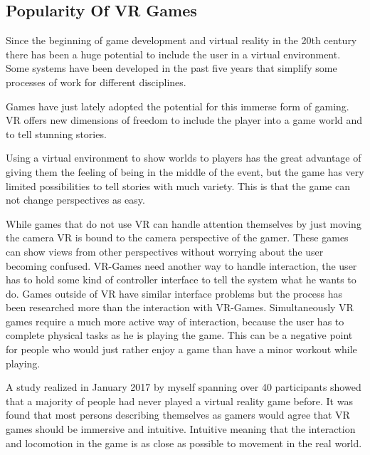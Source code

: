 
\subsection{Popularity Of VR Games}
Since the beginning of game development and virtual reality in the 20th century 
there has been a huge potential to include the user in a virtual environment. 
Some systems have been developed in the past five years that simplify some 
processes of work for different disciplines. 

Games have just lately adopted the potential for this immerse form of gaming. VR offers new dimensions of freedom to include the player into a game world and to tell stunning stories.

Using a virtual environment to show worlds to players has the great advantage of giving them the feeling of being in the middle of the event, but the game has very limited possibilities to tell stories with much variety. This is that the game can not change perspectives as easy. 

While games that do not use VR can handle attention themselves by just moving the camera VR is bound to the camera perspective of the gamer. These games can show views from other perspectives without worrying about the user becoming confused. VR-Games need another way to handle interaction, the user has to hold some kind of controller interface to tell the system what he wants to do. Games outside of VR have similar interface problems but the process has been researched more than the interaction with VR-Games. Simultaneously VR games require a much more active way of interaction, because the user has to complete physical tasks as he is playing the game. This can be a negative point for people who would just rather enjoy a game than have a minor workout while playing.

A study realized in January 2017 by myself spanning over 40 participants showed that a majority of people had never played a virtual reality game before. It was found that most persons describing themselves as gamers would agree that VR games should be immersive and intuitive. Intuitive meaning that the interaction and locomotion in the game is as close as possible to movement in the real world.

